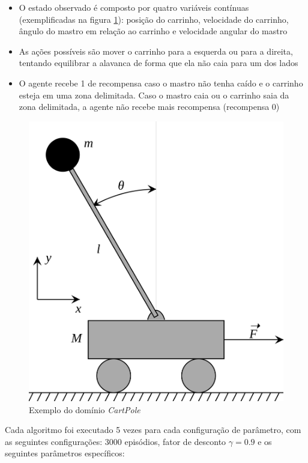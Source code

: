 \documentclass[letterpaper]{article}
\begin{document}
\begin{itemize}
  \item O estado observado é composto por quatro variáveis contínuas (exemplificadas na figura \ref{fig:cart-pole}): posição do carrinho, velocidade do carrinho, ângulo do mastro em relação ao carrinho e velocidade angular do mastro
  \item As ações possíveis são mover o carrinho para a esquerda ou para a direita, tentando equilibrar a alavanca de forma que ela não caia para um dos lados
  \item O agente recebe 1 de recompensa caso o mastro não tenha caído e o carrinho esteja em uma zona delimitada. Caso o mastro caia ou o carrinho saia da zona delimitada, a agente não recebe mais recompensa (recompensa 0)
\end{itemize}

\begin{figure}[t]
  \centering
  \includegraphics[width=0.9\columnwidth]{cart-pole}
  \caption{Exemplo do domínio \textit{CartPole}}
  \label{fig:cart-pole}
\end{figure}

Cada algoritmo foi executado 5 vezes para cada configuração de parâmetro, com as seguintes configurações: 3000 episódios, fator de desconto $\gamma = 0.9$ e os seguintes parâmetros específicos:
\end{document}
